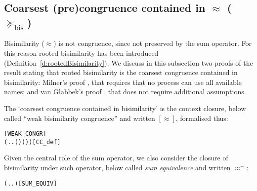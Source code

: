 
\subsection{Coarsest (pre)congruence contained in $\approx$ ($\succeq_{\mathrm{bis}}$)}
\label{s:coarsest}


Bisimilarity ($\approx$) is not  congruence, since not preserved by 
the sum operator. For this reason rooted bisimilarity has been
introduced (Definition~\ref{d:rootedBisimilarity}). 
We discuss in this subsection two proofs of the result stating that
rooted bisimilarity is the coarsest congruence contained in
bisimilarity: Milner's proof \cite{Mil89}, that requires
that no process can use all available names; and van Glabbek's proof
\cite{vanGlabbeek:2005ur}, that does not require additional assumptions. 

The `coarsest congruence contained in bisimilarity' is 
the context closure, below called 
``weak bisimilarity congruence'' and written $[\approx]$, formalised thus:
\begin{alltt}
 \HOLSymConst{=}  \hfill{[WEAK_CONGR]}
  \HOLSymConst{=} (\HOLTokenLambda{} . \HOLSymConst{\HOLTokenForall{}}.   \HOLSymConst{\HOLTokenImp{}}  ( ) ( ))\hfill{[CC_def]}
\end{alltt}

Given the central role of the  
 sum operator, we also consider the closure of bisimilarity under such
 operator, 
below called \emph{sum equivalence} and written $\approx^+$:
\begin{alltt}
 \HOLSymConst{=} (\HOLTokenLambda{} . \HOLSymConst{\HOLTokenForall{}}.  \HOLSymConst{+}  \HOLSymConst{\HOLTokenWeakEQ}  \HOLSymConst{+} )\hfill{[SUM_EQUIV]}
\end{alltt}


